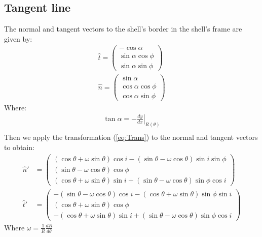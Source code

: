 \subsection{Tangent line}

The normal and tangent vectors to the shell's border in the shell's frame are given by:
\begin{align}
\hat{t} = \left(\begin{array}{c}
-\cos\alpha \\
\sin\alpha\cos\phi\\
\sin\alpha\sin\phi
\end{array}\right)\\
\hat{n} = \left(\begin{array}{c}
\sin\alpha \\
\cos\alpha\cos\phi \\
\cos\alpha\sin\phi
\end{array}\right)
\end{align}
Where:
\begin{align}
\tan\alpha = -\left.\frac{dy}{dx}\right|_{R(\theta)} \\
\label{eq:tanalpha}
\end{align}
Then we apply the transformation (\ref{eq:Trans}) to the normal and tangent vectors to obtain:
\begin{align}
\hat{n}' &= \left(\begin{array}{c}
(\cos\theta+\omega\sin\theta)\cos i -(\sin\theta-\omega\cos\theta)\sin i \sin\phi\\
(\sin\theta-\omega\cos\theta)\cos\phi \\
(\cos\theta+\omega\sin\theta)\sin i + (\sin\theta-\omega\cos\theta)\sin\phi\cos i
\end{array}\right)\\
\hat{t}' &= \left(\begin{array}{c}
-(\sin\theta-\omega\cos\theta)\cos i - (\cos\theta+\omega\sin\theta)\sin\phi\sin i \\
(\cos\theta+\omega\sin\theta)\cos\phi \\
-(\cos\theta+\omega\sin\theta)\sin i + (\sin\theta-\omega\cos\theta)\sin\phi\cos i
\end{array}\right)
\end{align}
Where $\omega = \frac{1}{R}\frac{dR}{d\theta}$

